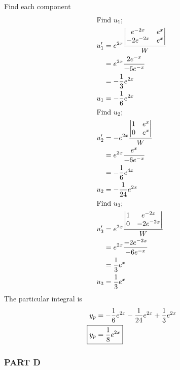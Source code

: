 \documentclass[12pt,final]{novelette} %
\begin{document}
\begin{question}[resume]
    Find each component
    \begin{align*}
        \intertext{Find $u_1$;}
        u'_1 & = e^{2x}\frac{
            \begin{vmatrix}
                e^{-2x}   & e^x \\
                -2e^{-2x} & e^x
            \end{vmatrix}
        }{W}                                      \\
             & = e^{2x}\frac{2e^{-x}}{-6e^{-x}}   \\
             & = -\frac13e^{2x}                   \\
        u_1  & = - \frac16 e^{2x}                 \\
        \intertext{Find $u_2$;}
        u'_2 & = - e^{2x}\frac{
            \begin{vmatrix}
                1 & e^x \\
                0 & e^x
            \end{vmatrix}
        }{W}                                      \\
             & = e^{2x}\frac{e^x}{-6e^{-x}}       \\
             & = -\frac16 e^{4x}                  \\
        u_2  & = - \frac{1}{24} e^{2x}            \\
        \intertext{Find $u_3$;}
        u'_3 & = e^{2x}\frac{
            \begin{vmatrix}
                1 & e^{-2x}   \\
                0 & -2e^{-2x}
            \end{vmatrix}
        }{W}                                      \\
             & = e^{2x}\frac{-2e^{-2x}}{-6e^{-x}} \\
             & = \frac13 e^x                      \\
        u_3  & = \frac13 e^x
    \end{align*}
    The particular integral is
    \begin{align*}
        y_p         & = -\frac16e^{2x} - \frac1{24} e^{2x} + \frac13 e^{2x} \\
        \Aboxed{y_p & = \frac18 e^{2x}}
    \end{align*}
\end{question}

\subsubsection*{PART D}
\end{document}
